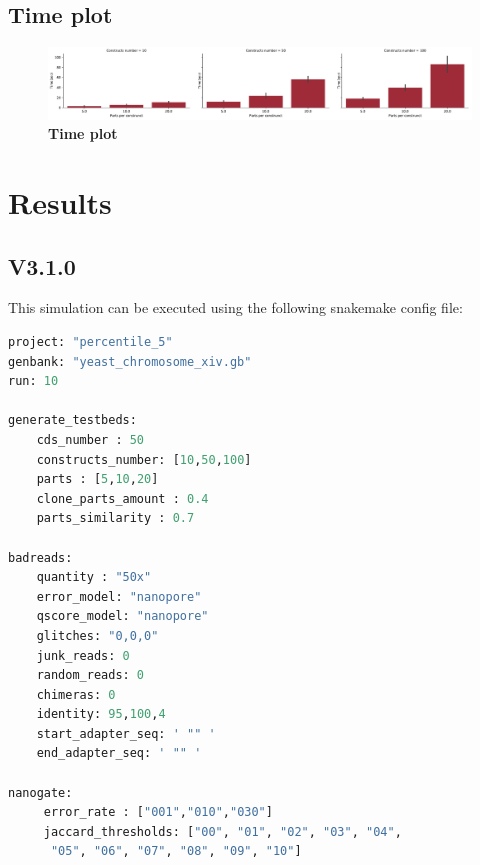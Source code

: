 \documentclass[11pt, a4paper]{article}
\begin{document}
 \subsection{Time plot}
  \begin{figure}[ht]
      \begin{center}
     \includegraphics[width=1\textwidth]{../results/images_notebook/v_006/time_plot.pdf}
     \end{center}
      \caption{{\bf Time plot }}
     \label{fig:v_006_time_plot}
 \end{figure}



\section{Results}
\subsection{V3.1.0 }
This simulation can be executed using the following snakemake config file:
  \begin{lstlisting}[language=Python]
project: "percentile_5"
genbank: "yeast_chromosome_xiv.gb"
run: 10

generate_testbeds:
    cds_number : 50
    constructs_number: [10,50,100]
    parts : [5,10,20]
    clone_parts_amount : 0.4
    parts_similarity : 0.7

badreads:
    quantity : "50x"
    error_model: "nanopore"
    qscore_model: "nanopore"
    glitches: "0,0,0"
    junk_reads: 0
    random_reads: 0
    chimeras: 0
    identity: 95,100,4
    start_adapter_seq: ' "" '
    end_adapter_seq: ' "" '

nanogate:
     error_rate : ["001","010","030"]
     jaccard_thresholds: ["00", "01", "02", "03", "04",
      "05", "06", "07", "08", "09", "10"]

\end{lstlisting}
\end{document}

